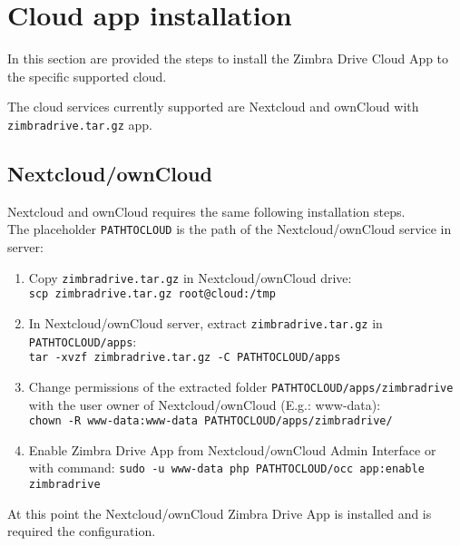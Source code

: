 \section{Cloud app installation}

In this section are provided the steps to install the Zimbra Drive Cloud App to the specific supported cloud.
\begin{warning}
The cloud services currently supported are Nextcloud and ownCloud with \texttt{zimbradrive.tar.gz} app.
\end{warning}

\subsection{Nextcloud/ownCloud}\label{subsec:NextcloudownCloudInstallation}
    Nextcloud and ownCloud requires the same following installation steps.\\
    The placeholder \texttt{PATH\textunderscore TO\textunderscore CLOUD} is the path of the Nextcloud/ownCloud service in server:

    \begin{enumerate}
        \item Copy \texttt{zimbradrive.tar.gz} in Nextcloud/ownCloud drive:\\
        \texttt{scp zimbradrive.tar.gz root@cloud:/tmp}

        \item In Nextcloud/ownCloud server, extract \texttt{zimbradrive.tar.gz}  in \texttt{PATH\textunderscore TO\textunderscore CLOUD/apps}:\\
        \texttt{tar -xvzf zimbradrive.tar.gz -C \texttt{PATH\textunderscore TO\textunderscore CLOUD}/apps}
        
        \item Change permissions of the extracted folder \texttt{PATH\textunderscore TO\textunderscore CLOUD/apps/zimbradrive}
        with the user owner of Nextcloud/ownCloud (E.g.: www-data):\\
        \texttt{chown -R www-data:www-data PATH\textunderscore TO\textunderscore CLOUD/apps/zimbradrive/}
        
        \item Enable Zimbra Drive App from Nextcloud/ownCloud Admin Interface or with command: %
        \texttt{sudo -u www-data php PATH\textunderscore TO\textunderscore CLOUD/occ app:enable zimbradrive}
    \end{enumerate}

    At this point the Nextcloud/ownCloud Zimbra Drive App is installed and is required the configuration.
